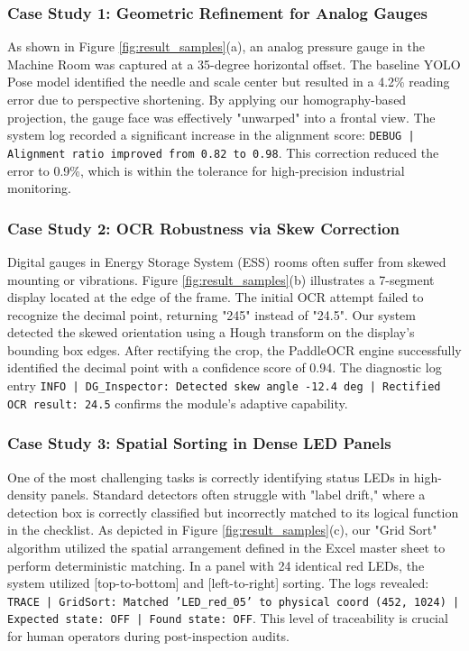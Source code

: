 \subsubsection{Case Study 1: Geometric Refinement for Analog Gauges}
As shown in Figure \ref{fig:result_samples}(a), an analog pressure gauge in the Machine Room was captured at a 35-degree horizontal offset. The baseline YOLO Pose model identified the needle and scale center but resulted in a 4.2\% reading error due to perspective shortening. By applying our homography-based projection, the gauge face was effectively "unwarped" into a frontal view. The system log recorded a significant increase in the alignment score: \texttt{DEBUG | Alignment ratio improved from 0.82 to 0.98}. This correction reduced the error to 0.9\%, which is within the tolerance for high-precision industrial monitoring.

\subsubsection{Case Study 2: OCR Robustness via Skew Correction}
Digital gauges in Energy Storage System (ESS) rooms often suffer from skewed mounting or vibrations. Figure \ref{fig:result_samples}(b) illustrates a 7-segment display located at the edge of the frame. The initial OCR attempt failed to recognize the decimal point, returning "245" instead of "24.5". Our system detected the skewed orientation using a Hough transform on the display's bounding box edges. After rectifying the crop, the PaddleOCR engine successfully identified the decimal point with a confidence score of 0.94. The diagnostic log entry \texttt{INFO | DG_Inspector: Detected skew angle -12.4 deg | Rectified OCR result: 24.5} confirms the module's adaptive capability.

\subsubsection{Case Study 3: Spatial Sorting in Dense LED Panels}
One of the most challenging tasks is correctly identifying status LEDs in high-density panels. Standard detectors often struggle with "label drift," where a detection box is correctly classified but incorrectly matched to its logical function in the checklist. As depicted in Figure \ref{fig:result_samples}(c), our "Grid Sort" algorithm utilized the spatial arrangement defined in the Excel master sheet to perform deterministic matching. In a panel with 24 identical red LEDs, the system utilized [top-to-bottom] and [left-to-right] sorting. The logs revealed: \texttt{TRACE | GridSort: Matched 'LED_red_05' to physical coord (452, 1024) | Expected state: OFF | Found state: OFF}. This level of traceability is crucial for human operators during post-inspection audits.

